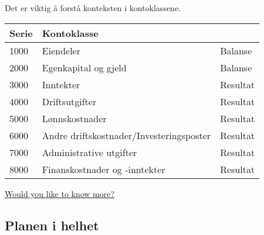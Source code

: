 Det er viktig å forstå konteksten i kontoklassene.
\begin{table}[h]
	\begin{tabular}[c]{l l l}
		Serie & Kontoklasse \\ \hline
		1000 & Eiendeler & Balanse \\
		2000 & Egenkapital og gjeld & Balanse \\
		3000 & Inntekter & Resultat \\
		4000 & Driftsutgifter & Resultat \\
		5000 & Lønnskostnader & Resultat \\
		6000 & Andre driftskostnader/Investeringsposter & Resultat \\
		7000 & Administrative utgifter & Resultat \\
		8000 & Finanskostnader og -inntekter & Resultat \\
	\end{tabular}
\end{table}



\hyperlink{ff_egenkap}{Would you like to know more?}


\subsection*{Planen i helhet}

